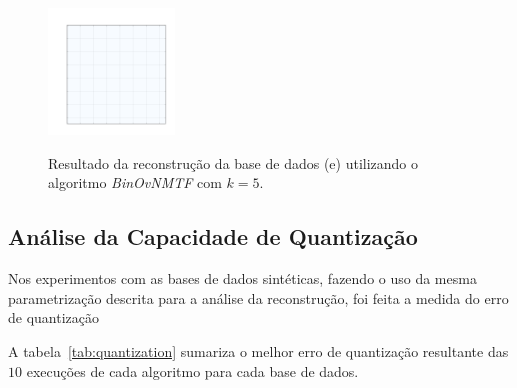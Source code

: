 \documentclass[
    12pt,                %
    oneside,            %
    a4paper,            %
    english,            %
    brazil                %
    ]{abntex2ppgsi}
\begin{document}
\begin{figure}[H]
\centering
    \caption{Resultado da reconstrução da base de dados (e) utilizando o algoritmo \textit{BinOvNMTF} com $k = 5$.}
    \includegraphics[width=0.3\textwidth]{img/e-reconstruction-2-binovnmtf.png}
    \label{fig:reconstruction-2:binovnmtf}
\end{figure}

\subsection{Análise da Capacidade de Quantização}

Nos experimentos com as bases de dados sintéticas, fazendo o uso da mesma parametrização descrita para a análise da reconstrução, foi feita a medida do erro de quantização

A tabela~\ref{tab:quantization} sumariza o melhor erro de quantização resultante das $10$ execuções de cada algoritmo para cada base de dados.

\end{document}
